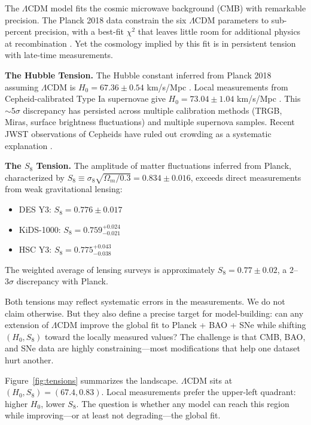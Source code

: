 \documentclass[twocolumn,showpacs,preprintnumbers,amsmath,amssymb,prd]{revtex4-2}
\begin{document}
The $\Lambda$CDM model fits the cosmic microwave background (CMB) with remarkable precision. The Planck 2018 data constrain the six $\Lambda$CDM parameters to sub-percent precision, with a best-fit $\chi^2$ that leaves little room for additional physics at recombination \cite{Planck2018}. Yet the cosmology implied by this fit is in persistent tension with late-time measurements.

\textbf{The Hubble Tension.} The Hubble constant inferred from Planck 2018 assuming $\Lambda$CDM is $H_0 = 67.36 \pm 0.54$ km/s/Mpc \cite{Planck2018}. Local measurements from Cepheid-calibrated Type Ia supernovae give $H_0 = 73.04 \pm 1.04$ km/s/Mpc \cite{Riess2022}. This $\sim 5\sigma$ discrepancy has persisted across multiple calibration methods (TRGB, Miras, surface brightness fluctuations) and multiple supernova samples. Recent JWST observations of Cepheids have ruled out crowding as a systematic explanation \cite{Riess2024}.

\textbf{The $S_8$ Tension.} The amplitude of matter fluctuations inferred from Planck, characterized by $S_8 \equiv \sigma_8\sqrt{\Omega_m/0.3} = 0.834 \pm 0.016$, exceeds direct measurements from weak gravitational lensing:
\begin{itemize}
    \item DES Y3: $S_8 = 0.776 \pm 0.017$ \cite{DES2022}
    \item KiDS-1000: $S_8 = 0.759^{+0.024}_{-0.021}$ \cite{KiDS2021}
    \item HSC Y3: $S_8 = 0.775^{+0.043}_{-0.038}$ \cite{HSC2023}
\end{itemize}
The weighted average of lensing surveys is approximately $S_8 = 0.77 \pm 0.02$, a $2$--$3\sigma$ discrepancy with Planck.

Both tensions may reflect systematic errors in the measurements. We do not claim otherwise. But they also define a precise target for model-building: can any extension of $\Lambda$CDM improve the global fit to Planck + BAO + SNe while shifting $(H_0, S_8)$ toward the locally measured values? The challenge is that CMB, BAO, and SNe data are highly constraining---most modifications that help one dataset hurt another.

Figure~\ref{fig:tensions} summarizes the landscape. $\Lambda$CDM sits at $(H_0, S_8) = (67.4, 0.83)$. Local measurements prefer the upper-left quadrant: higher $H_0$, lower $S_8$. The question is whether any model can reach this region while improving---or at least not degrading---the global fit.
\end{document}
